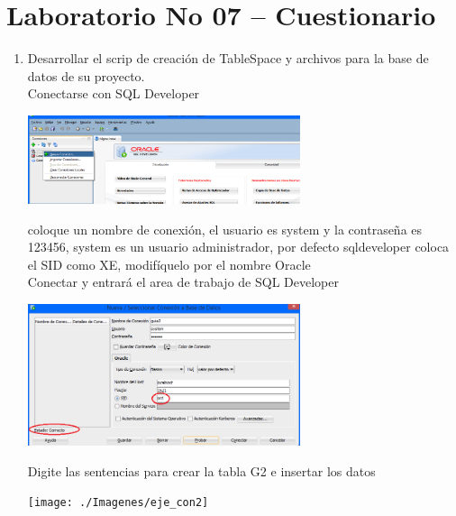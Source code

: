 \section{Laboratorio No 07 – Cuestionario} 

\begin{enumerate}[1.]
	
	\item Desarrollar el scrip de creaci\'on de TableSpace y archivos para la base de datos de su proyecto.
	\\Conectarse con SQL Developer

	\begin{center}
	\includegraphics[width=8cm]{./Imagenes/eje7_con}
	\end{center}	
	coloque un nombre de conexi\'on, el usuario es system y la contraseña es 123456, system es un usuario administrador, por defecto sqldeveloper coloca el SID como XE, modif\'iquelo por el nombre Oracle
	\\Conectar y entrar\'a el area de trabajo de SQL Developer

	\begin{center}
	\includegraphics[width=8cm]{./Imagenes/eje_con1}
	\end{center}	

	Digite las sentencias para crear la tabla G2 e insertar los datos\\
	\begin{center}
	\texttt{[image: ./Imagenes/eje\_con2]}
	\end{center}	


\end{enumerate}
